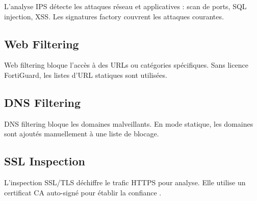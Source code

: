 L'analyse IPS détecte les attaques réseau et applicatives : scan de ports, SQL injection, XSS. Les signatures factory couvrent les attaques courantes.

\subsection{Web Filtering}

Web filtering bloque l'accès à des URLs ou catégories spécifiques. Sans licence FortiGuard, les listes d'URL statiques sont utilisées.

\subsection{DNS Filtering}

DNS filtering bloque les domaines malveillants. En mode statique, les domaines sont ajoutés manuellement à une liste de blocage.

\subsection{SSL Inspection}

L'inspection SSL/TLS déchiffre le trafic HTTPS pour analyse. Elle utilise un certificat CA auto-signé pour établir la confiance \cite{5}.
